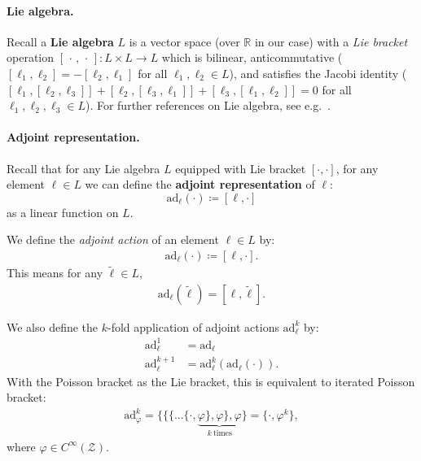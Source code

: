 \documentclass[11pt]{article}
\newcommand{\R}{\mathbb{R}}
\newcommand{\Z}{\mathcal{Z}}
\newcommand{\ad}{\mathrm{ad}}
\begin{document}
\paragraph{Lie algebra.}
Recall a {\bf Lie algebra} $L$ is a vector space (over $\R$ in our case) with a {\em Lie bracket} operation $[\,\cdot\, , \,\cdot\,] \colon L \times L \to L$ which is bilinear, anticommutative ($[\ell_1,\ell_2] = -[\ell_2, \ell_1]$ for all $\ell_1,\ell_2 \in L$), and satisfies the Jacobi identity ($[\ell_1,[\ell_2,\ell_3]] + [\ell_2,[\ell_3,\ell_1]] + [\ell_3,[\ell_1,\ell_2]] = 0$ for all $\ell_1,\ell_2,\ell_3 \in L$).
For further references on Lie algebra, see e.g.~\cite{Hall2015,Jacobson1979,Varadarajan1984}.

\paragraph{Adjoint representation.}
Recall that for any Lie algebra $L$ equipped with Lie bracket $\left[\cdot,\cdot\right]$, for any element $\ell \in L$ we can define the {\bf adjoint representation} of $\ell$:
$$\ad_{\ell}\left(\cdot\right)\coloneqq \left[\ell,\cdot\right]$$ 
as a linear function on $L$. 

We define the {\em adjoint action} of an element $\ell \in L$ by:
\begin{align}
\ad_{\ell }\left( \cdot \right)\coloneqq \left[\ell, \cdot\right].
\end{align}
This means for any  $\widetilde{\ell} \in L$,
\begin{align}
\ad_{\ell}\left(\widetilde{\ell}\right)=\left[\ell,\widetilde{\ell}\right].
\end{align}

\noindent We also define the $k$-fold application of adjoint actions $\ad_\ell^{k}$ by:
\begin{align}
    \ad_\ell^1 &= \ad_\ell \\
    \ad_\ell^{k+1} &= \ad_\ell^k(\ad_\ell(\cdot)).
\end{align}
With the Poisson bracket as the Lie bracket, this is equivalent to iterated Poisson bracket:
\begin{align}
    \ad_\varphi^k = \{\{\{...\{\cdot,\underbrace{\varphi\},\varphi\},\varphi}_{k~\text{times}}\} = \{\cdot, \varphi^k\},
\end{align}
where $\varphi\in C^{\infty}\left(\Z\right)$.
\end{document}
